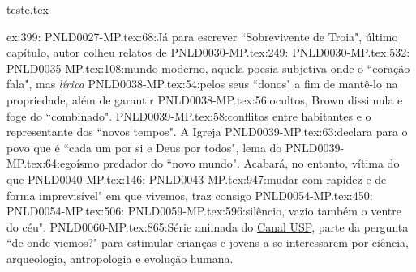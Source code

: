 teste.tex

ex:399:
PNLD0027-MP.tex:68:Já para escrever ``Sobrevivente de Troia", último capítulo, autor colheu relatos de 
PNLD0030-MP.tex:249:
PNLD0030-MP.tex:532:
PNLD0035-MP.tex:108:mundo moderno, aquela poesia subjetiva onde o ``coração fala", mas \emph{lírica}
PNLD0038-MP.tex:54:pelos seus ``donos" a fim de mantê-lo na propriedade, além de garantir
PNLD0038-MP.tex:56:ocultos, Brown dissimula e foge do ``combinado".
PNLD0039-MP.tex:58:conflitos entre habitantes e o representante dos ``novos tempos". A Igreja 
PNLD0039-MP.tex:63:declara para o povo que é ``cada um por si e Deus por todos", lema do 
PNLD0039-MP.tex:64:egoísmo predador do ``novo mundo". Acabará, no entanto, vítima do que 
PNLD0040-MP.tex:146:
PNLD0043-MP.tex:947:mudar com rapidez e de forma imprevisível" em que vivemos, traz consigo
PNLD0054-MP.tex:450:
PNLD0054-MP.tex:506:
PNLD0059-MP.tex:596:silêncio, vazio também o ventre do céu".
PNLD0060-MP.tex:865:Série animada do \href{https://www.youtube.com/watch?v=d_4hLpzRh1A}{Canal USP}, parte da pergunta ``de onde viemos?" para estimular crianças e jovens a se interessarem por ciência, arqueologia, antropologia e evolução humana.
	